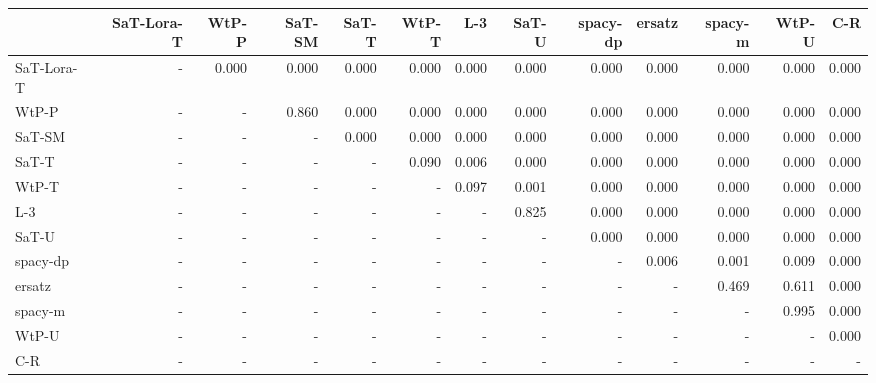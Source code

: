 \begin{tabular}{lrrrrrrrrrrrr}
\toprule
 & SaT-Lora-T & WtP-P & SaT-SM & SaT-T & WtP-T & L-3 & SaT-U & spacy-dp & ersatz & spacy-m & WtP-U & C-R \\
\midrule
SaT-Lora-T & - & 0.000 & 0.000 & 0.000 & 0.000 & 0.000 & 0.000 & 0.000 & 0.000 & 0.000 & 0.000 & 0.000 \\
WtP-P & - & - & 0.860 & 0.000 & 0.000 & 0.000 & 0.000 & 0.000 & 0.000 & 0.000 & 0.000 & 0.000 \\
SaT-SM & - & - & - & 0.000 & 0.000 & 0.000 & 0.000 & 0.000 & 0.000 & 0.000 & 0.000 & 0.000 \\
SaT-T & - & - & - & - & 0.090 & 0.006 & 0.000 & 0.000 & 0.000 & 0.000 & 0.000 & 0.000 \\
WtP-T & - & - & - & - & - & 0.097 & 0.001 & 0.000 & 0.000 & 0.000 & 0.000 & 0.000 \\
L-3 & - & - & - & - & - & - & 0.825 & 0.000 & 0.000 & 0.000 & 0.000 & 0.000 \\
SaT-U & - & - & - & - & - & - & - & 0.000 & 0.000 & 0.000 & 0.000 & 0.000 \\
spacy-dp & - & - & - & - & - & - & - & - & 0.006 & 0.001 & 0.009 & 0.000 \\
ersatz & - & - & - & - & - & - & - & - & - & 0.469 & 0.611 & 0.000 \\
spacy-m & - & - & - & - & - & - & - & - & - & - & 0.995 & 0.000 \\
WtP-U & - & - & - & - & - & - & - & - & - & - & - & 0.000 \\
C-R & - & - & - & - & - & - & - & - & - & - & - & - \\
\bottomrule
\end{tabular}

